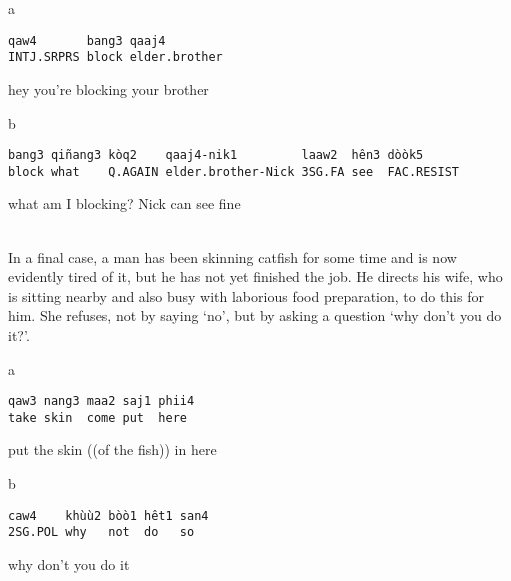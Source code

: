 \documentclass[output=paper]{langsci/langscibook}
\begin{document}
\vspace{-1mm}
%
\begin{mdframednoverticalspace}[style=firstfoc]
\begin{transbox}{1}{a}
\begin{verbatim}
qaw4       bang3 qaaj4
INTJ.SRPRS block elder.brother
\end{verbatim}
hey you're blocking your brother
\end{transbox}
\end{mdframednoverticalspace}
%
\begin{mdframednoverticalspace}[style=secondfoc]
\begin{transbox}{2}{b}
\begin{verbatim}
bang3 qiñang3 kòq2    qaaj4-nik1         laaw2  hên3 dòòk5
block what    Q.AGAIN elder.brother-Nick 3SG.FA see  FAC.RESIST
\end{verbatim}
what am I blocking? Nick can see fine
\end{transbox}
\end{mdframednoverticalspace}\\

In a final case, a man has been skinning catfish for some time and is now evidently tired of it, but he has not yet finished the job. He directs his wife, who is sitting nearby and also busy with laborious food preparation, to do this for him. She refuses, not by saying ‘no’, but by asking a question ‘why don’t you do it?’.

\vspace{-1mm}
%
\begin{mdframednoverticalspace}[style=firstfoc]
\begin{transbox}{1}{a}
\begin{verbatim}
qaw3 nang3 maa2 saj1 phii4
take skin  come put  here
\end{verbatim}
put the skin ((of the fish)) in here 
\end{transbox}
\end{mdframednoverticalspace}
%
%
\begin{mdframednoverticalspace}[style=secondfoc]
\begin{transbox}{2}{b}
\begin{verbatim}
caw4    khùù2 bòò1 hêt1 san4
2SG.POL why   not  do   so
\end{verbatim}
why don't you do it
\end{transbox}
\end{mdframednoverticalspace}\vspace{-1mm}
%
\bigskip
\end{document}
